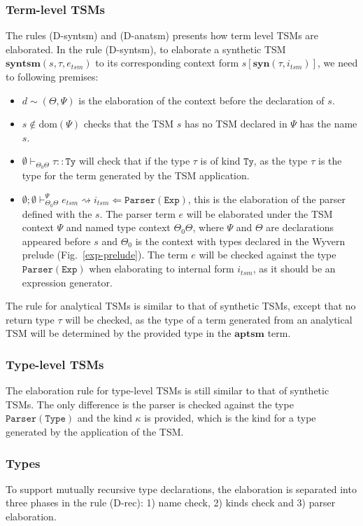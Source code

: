 \subsubsection{Term-level TSMs}
The rules (D-syntsm) and (D-anatsm) presents how term level TSMs are elaborated. In the rule (D-syntsm), to elaborate a synthetic TSM $\mathbf{syntsm}(s,\tau,e_{tsm})$ to its corresponding context form $s[\mathbf{syn}(\tau,i_{tsm})]$, we need to following premises:
\begin{itemize}\itemsep0pt
\item $d\sim(\Theta,\Psi)$ is the elaboration of the context before the declaration of $s$.
\item $s\notin\text{dom}(\Psi)$ checks that the TSM $s$ has no TSM declared in $\Psi$ has the name $s$.
\item $\emptyset\vdash_{\Theta_0\Theta}\tau::\mathtt{Ty}$ will check that if the type $\tau$ is of kind $\mathtt{Ty}$, as the type $\tau$ is the type for the term generated by the TSM application.
\item $\emptyset;\emptyset\vdash_{\Theta_0\Theta}^{\Psi}e_{tsm}\rightsquigarrow i_{tsm} \Leftarrow \mathtt{Parser(Exp)}$, this is the elaboration of the parser defined with the $s$. The parser term $e$ will be elaborated under the TSM context $\Psi$ and named type context $\Theta_0\Theta$, where $\Psi$ and $\Theta$ are declarations appeared before $s$ and $\Theta_0$ is the context with types declared in the Wyvern prelude (Fig.~\ref{exp-prelude}). The term $e$ will be checked against the type $\mathtt{Parser(Exp)}$ when elaborating to internal form $i_{tsm}$, as it should be an expression generator.
\end{itemize}

The rule for analytical TSMs is similar to that of synthetic TSMs, except that no return type $\tau$ will be checked, as the type of a term generated from an analytical TSM will be determined by the provided type in the $\mathbf{aptsm}$ term.

\subsubsection{Type-level TSMs}
The elaboration rule for type-level TSMs is still similar to that of synthetic TSMs. The only difference is the parser is checked against the type $\mathtt{Parser(Type)}$ and the kind $\kappa$ is provided, which is the kind for a type generated by the application of the TSM.

\subsubsection{Types}
To support mutually recursive type declarations, the elaboration is separated into three phases in the rule (D-rec): 1) name check, 2) kinds check and 3) parser elaboration.

